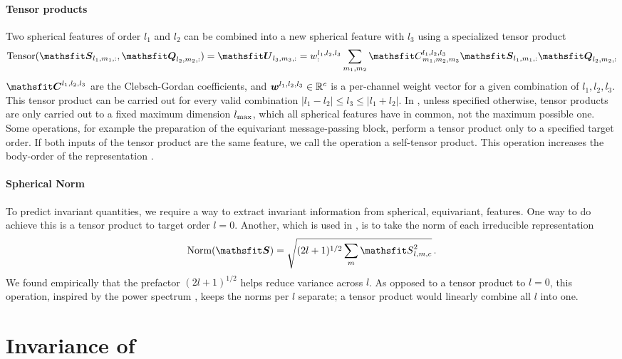 \documentclass[10pt]{article} %
\begin{document}
\paragraph{Tensor products} Two spherical features of order $l_1$ and $l_2$ can be combined into a new spherical feature with $l_3$ using a specialized tensor product
\begin{equation}
    \text{Tensor}(\tS_{l_1,m_1,:}, \tQ_{l_2,m_2,:}) = \tU_{l_3,m_3,:}
    = \evw^{l_1,l_2,l_3}_{:} \sum_{m_1,m_2} \etC_{m_1,m_2,m_3}^{l_1,l_2,l_3} \tS_{l_1,m_1,:} \tQ_{l_2,m_2,:}
\end{equation}
$\tC^{l_1,l_2,l_3}$ are the Clebsch-Gordan coefficients, and ${\bm{w}}^{l_1,l_2,l_3} \in \mathbb{R}^c$ is a per-channel weight vector for a given combination of $l_1,l_2,l_3$. This tensor product can be carried out for every valid combination $|l_1 - l_2| \leq l_3 \leq |l_1 + l_2|$.
In \lorem, unless specified otherwise, tensor products are only carried out to a fixed maximum dimension $l_{\text{max}}$, which all spherical features have in common, not the maximum possible one. Some operations, for example the preparation of the equivariant message-passing block, perform a tensor product only to a specified target order.
If both inputs of the tensor product are the same feature, we call the operation a self-tensor product. This operation increases the body-order of the representation \citep{dbcdevo2022,bksoc2022}.

\paragraph{Spherical Norm} To predict invariant quantities, we require a way to extract invariant information from spherical, equivariant, features. One way to do achieve this is a tensor product to target order $l=0$. Another, which is used in \lorem, is to take the norm of each irreducible representation
\begin{equation}
    \text{Norm}(\tS) = \sqrt{(2l+1)^{1/2} \sum_m \etS_{l,m,c}^2 } \, .
\end{equation}
We found empirically that the prefactor $(2l+1)^{1/2}$ helps reduce variance across $l$.
As opposed to a tensor product to $l=0$, this operation, inspired by the power spectrum \citep{bkc2013}, keeps the norms per $l$ separate; a tensor product would linearly combine all $l$ into one.


\section{Invariance of \lorem}
\label{sec:ap_equiv}
\end{document}
